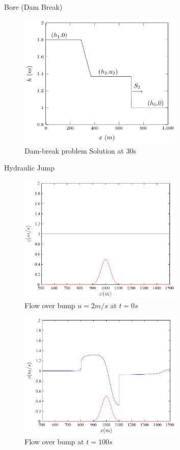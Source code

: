 \documentclass[handout]{beamer}
\begin{document}
\begin{frame}{Bore (Dam Break)}
	\begin{figure}
		\includegraphics[width=0.7\textwidth]{./Figures/SWWlabel.pdf}
		\caption{Dam-break problem Solution at 30s}
	\end{figure}
\end{frame}

\begin{frame}{Hydraulic Jump}
	\begin{figure}
		\includegraphics[width=0.7\textwidth]{./Figures/ICu=2.png}
		\caption{Flow over bump $u = 2m/s$ at  $t= 0s$}
	\end{figure}
\end{frame}

\begin{frame}
	\begin{figure}
		\includegraphics[width=0.7\textwidth]{./Figures/SWWEt=100s.png}
		\caption{Flow over bump at $t= 100s$}
	\end{figure}
\end{frame}
\end{document}
